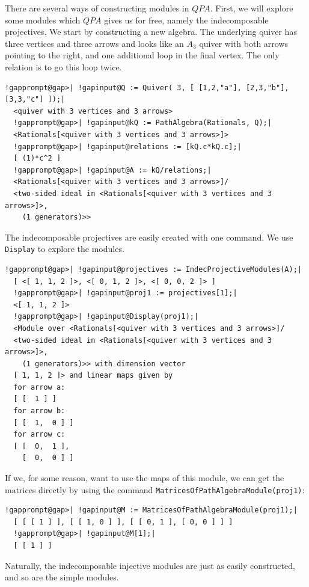 \documentclass[a4paper,11pt]{report}
\begin{document}
{{ There are several ways of constructing modules in $QPA$. First, we will explore some modules which $QPA$ gives us for free, namely the indecomposable projectives. We start by
constructing a new algebra. The underlying quiver has three vertices and three
arrows and looks like an $A_3$ quiver with both arrows pointing to the right, and one additional loop in the
final vertex. The only relation is to go this loop twice. 
\begin{Verbatim}[commandchars=!@|,fontsize=\small,frame=single,label=Example]
  !gapprompt@gap>| !gapinput@Q := Quiver( 3, [ [1,2,"a"], [2,3,"b"], [3,3,"c"] ]);|
  <quiver with 3 vertices and 3 arrows>
  !gapprompt@gap>| !gapinput@kQ := PathAlgebra(Rationals, Q);|
  <Rationals[<quiver with 3 vertices and 3 arrows>]>
  !gapprompt@gap>| !gapinput@relations := [kQ.c*kQ.c];|
  [ (1)*c^2 ]
  !gapprompt@gap>| !gapinput@A := kQ/relations;|
  <Rationals[<quiver with 3 vertices and 3 arrows>]/
  <two-sided ideal in <Rationals[<quiver with 3 vertices and 3 arrows>]>, 
    (1 generators)>>
\end{Verbatim}
 The indecomposable projectives are easily created with one command. We use \texttt{Display} to explore the modules. 
\begin{Verbatim}[commandchars=!@|,fontsize=\small,frame=single,label=Example]
  !gapprompt@gap>| !gapinput@projectives := IndecProjectiveModules(A);|
  [ <[ 1, 1, 2 ]>, <[ 0, 1, 2 ]>, <[ 0, 0, 2 ]> ]
  !gapprompt@gap>| !gapinput@proj1 := projectives[1];|
  <[ 1, 1, 2 ]>
  !gapprompt@gap>| !gapinput@Display(proj1);|
  <Module over <Rationals[<quiver with 3 vertices and 3 arrows>]/
  <two-sided ideal in <Rationals[<quiver with 3 vertices and 3 arrows>]>, 
    (1 generators)>> with dimension vector 
  [ 1, 1, 2 ]> and linear maps given by
  for arrow a:
  [ [  1 ] ]
  for arrow b:
  [ [  1,  0 ] ]
  for arrow c:
  [ [  0,  1 ],
    [  0,  0 ] ]
\end{Verbatim}
 If we, for some reason, want to use the maps of this module, we can get the
matrices directly by using the command \texttt{MatricesOfPathAlgebraModule(proj1)}: 
\begin{Verbatim}[commandchars=!@|,fontsize=\small,frame=single,label=Example]
  !gapprompt@gap>| !gapinput@M := MatricesOfPathAlgebraModule(proj1);|
  [ [ [ 1 ] ], [ [ 1, 0 ] ], [ [ 0, 1 ], [ 0, 0 ] ] ]
  !gapprompt@gap>| !gapinput@M[1];|
  [ [ 1 ] ]
\end{Verbatim}
 Naturally, the indecomposable injective modules are just as easily
constructed, and so are the simple modules. 
\begin{Verbatim}[commandchars=!@|,fontsize=\small,frame=single,label=Example]

\end{Verbatim}}}
\end{document}
